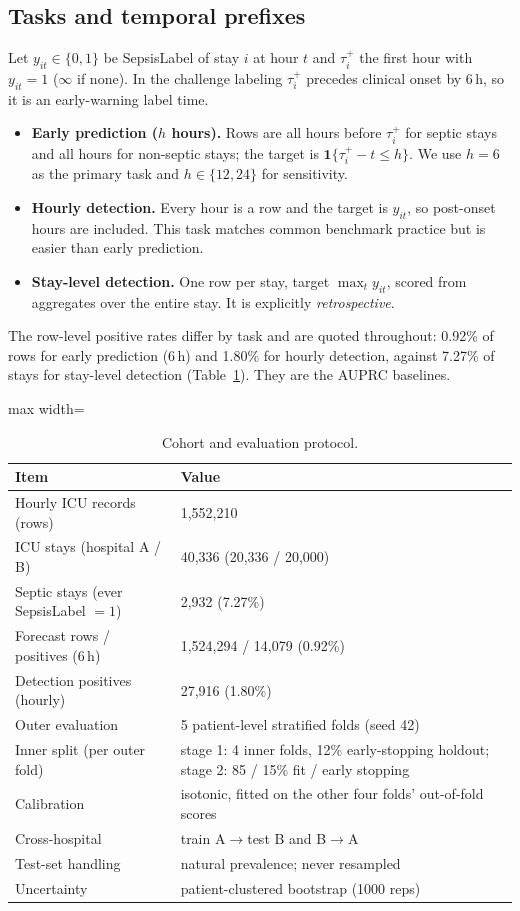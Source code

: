 \documentclass[preprint,12pt]{elsarticle}
\begin{document}
\subsection{Tasks and temporal prefixes}
Let $y_{it}\in\{0,1\}$ be SepsisLabel of stay $i$ at hour $t$ and $\tau_i^{+}$ the first hour with $y_{it}=1$ ($\infty$ if none). In the challenge labeling $\tau_i^{+}$ precedes clinical onset by 6\,h, so it is an early-warning label time.
\begin{itemize}
\item \textbf{Early prediction ($h$ hours).} Rows are all hours before $\tau_i^{+}$ for septic stays and all hours for non-septic stays; the target is $\mathbf{1}\{\tau_i^{+}-t\le h\}$. We use $h=6$ as the primary task and $h\in\{12,24\}$ for sensitivity.
\item \textbf{Hourly detection.} Every hour is a row and the target is $y_{it}$, so post-onset hours are included. This task matches common benchmark practice but is easier than early prediction.
\item \textbf{Stay-level detection.} One row per stay, target $\max_t y_{it}$, scored from aggregates over the entire stay. It is explicitly \emph{retrospective}.
\end{itemize}
The row-level positive rates differ by task and are quoted throughout: 0.92\% of rows for early prediction (6\,h) and 1.80\% for hourly detection, against 7.27\% of stays for stay-level detection (Table~\ref{tab:protocol}). They are the AUPRC baselines.

\begin{table}[!t]
\centering\footnotesize
\caption{Cohort and evaluation protocol.}
\label{tab:protocol}
\begin{adjustbox}{max width=\linewidth}
\begin{tabular}{ll}
\toprule
Item & Value \\
\midrule
Hourly ICU records (rows) & 1{,}552{,}210 \\
ICU stays (hospital A / B) & 40{,}336 (20{,}336 / 20{,}000) \\
Septic stays (ever SepsisLabel $=1$) & 2{,}932 (7.27\%) \\
Forecast rows / positives (6\,h) & 1{,}524{,}294 / 14{,}079 (0.92\%) \\
Detection positives (hourly) & 27{,}916 (1.80\%) \\
Outer evaluation & 5 patient-level stratified folds (seed 42) \\
Inner split (per outer fold) & stage 1: 4 inner folds, 12\% early-stopping holdout; stage 2: 85 / 15\% fit / early stopping \\
Calibration & isotonic, fitted on the other four folds' out-of-fold scores \\
Cross-hospital & train A$\to$test B and B$\to$A \\
Test-set handling & natural prevalence; never resampled \\
Uncertainty & patient-clustered bootstrap (1000 reps) \\
\bottomrule
\end{tabular}
\end{adjustbox}
\end{table}
\end{document}
